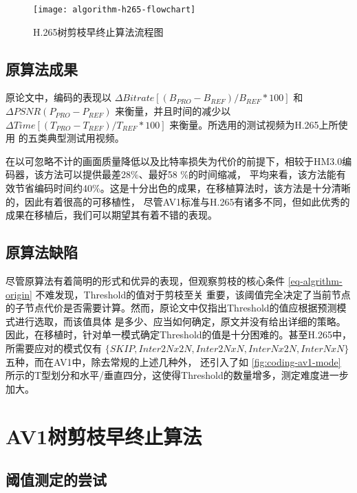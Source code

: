 \begin{figure}[H] %
  \centering
  \texttt{[image: algorithm-h265-flowchart]}
  \caption{H.265树剪枝早终止算法流程图}
  \label{fig:algorithm-h265-flowchart}
\end{figure}

\subsection{原算法成果}

原论文中，编码的表现以 $\Delta Bitrate[ (B_{PRO} - B_{REF})/B_{REF} * 100 ]$ 和 $ \Delta PSNR(P_{PRO} - P_{REF})$ 
来衡量，并且时间的减少以 $ \Delta Time[ (T_{PRO} - T_{REF})/T_{REF} * 100 ]$ 来衡量。所选用的测试视频为H.265上所使用
的五类典型测试用视频。

在以可忽略不计的画面质量降低以及比特率损失为代价的前提下，相较于HM3.0编码器，该方法可以提供最差28\%、最好58 \%的时间缩减，
平均来看，该方法能有效节省编码时间约40\%。这是十分出色的成果，在移植算法时，该方法是十分清晰的，因此有着很高的可移植性，
尽管AV1标准与H.265有诸多不同，但如此优秀的成果在移植后，我们可以期望其有着不错的表现。

\subsection{原算法缺陷}

尽管原算法有着简明的形式和优异的表现，但观察剪枝的核心条件 \ref{eq-algrithm-origin} 不难发现，Threshold的值对于剪枝至关
重要，该阈值完全决定了当前节点的子节点代价是否需要计算。然而，原论文中仅指出Threshold的值应根据预测模式进行选取，而该值具体
是多少、应当如何确定，原文并没有给出详细的策略。因此，在移植时，针对单一模式确定Threshold的值是十分困难的。甚至H.265中，
所需要应对的模式仅有 $\{ SKIP, Inter2Nx2N, Inter2NxN, InterNx2N, InterNxN \} $ 五种，而在AV1中，除去常规的上述几种外，
还引入了如 \ref{fig:coding-av1-mode} 所示的T型划分和水平/垂直四分，这使得Threshold的数量增多，测定难度进一步加大。

\section{AV1树剪枝早终止算法}

\subsection{阈值测定的尝试}
\label{sec:algorithm-threshold-try}

